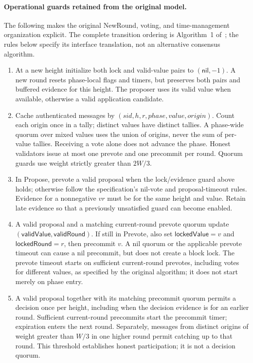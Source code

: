 \documentclass[conference,letterpaper,10pt]{IEEEtran}
\begin{document}
\paragraph{Operational guards retained from the original model.}
The following makes the original NewRound, voting, and time-management organization explicit. The complete transition ordering is Algorithm~1 of~\cite{buchman2018latest}; the rules below specify its interface translation, not an alternative consensus algorithm.
\begin{enumerate}
\item At a new height initialize both lock and valid-value pairs to $(\mathsf{nil},-1)$. A new round resets phase-local flags and timers, but preserves both pairs and buffered evidence for this height. The proposer uses its valid value when available, otherwise a valid application candidate.
\item Cache authenticated messages by $(sid,h,r,phase,value,origin)$. Count each origin once in a tally; distinct values have distinct tallies. A phase-wide quorum over mixed values uses the union of origins, never the sum of per-value tallies. Receiving a vote alone does not advance the phase. Honest validators issue at most one prevote and one precommit per round. Quorum guards use weight strictly greater than $2W/3$.
\item In Propose, prevote a valid proposal when the lock/evidence guard above holds; otherwise follow the specification's nil-vote and proposal-timeout rules. Evidence for a nonnegative $vr$ must be for the same height and value. Retain late evidence so that a previously unsatisfied guard can become enabled.
\item A valid proposal and a matching current-round prevote quorum update $(\mathsf{validValue},\mathsf{validRound})$. If still in Prevote, also set $\mathsf{lockedValue}=v$ and $\mathsf{lockedRound}=r$, then precommit $v$. A nil quorum or the applicable prevote timeout can cause a nil precommit, but does not create a block lock. The prevote timeout starts on sufficient current-round prevotes, including votes for different values, as specified by the original algorithm; it does not start merely on phase entry.
\item A valid proposal together with its matching precommit quorum permits a decision once per height, including when the decision evidence is for an earlier round. Sufficient current-round precommits start the precommit timer; expiration enters the next round. Separately, messages from distinct origins of weight greater than $W/3$ in one higher round permit catching up to that round. This threshold establishes honest participation; it is not a decision quorum.
\end{enumerate}
\end{document}

